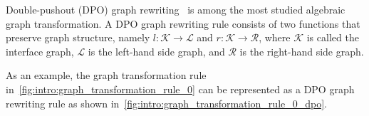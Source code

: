  Double-pushout (DPO) graph rewriting~\cite{corradini1997algebraic,habel2001double} is among the most studied algebraic graph transformation. A DPO graph rewriting rule consists of two functions that preserve graph structure, namely $l:\mathcal{K} \to \mathcal{L}$ and $r:\mathcal{K} \to \mathcal{R}$, where $\mathcal{K}$ is called the interface graph, $\mathcal{L}$ is the left-hand side graph, and $\mathcal{R}$ is the right-hand side graph. 
 
 As an example, the graph transformation rule in~\autoref{fig:intro:graph_transformation_rule_0} can be represented as a DPO graph rewriting rule as shown in~\autoref{fig:intro:graph_transformation_rule_0_dpo}.
 \begin{figure}[H]
    \centering
    \caption{}
    \label{fig:intro:graph_transformation_rule_0_dpo}
    \end{figure}

